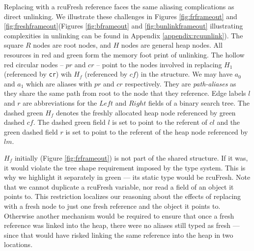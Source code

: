 Replacing with a \textsf{rcuFresh} reference faces the same aliasing complications as direct unlinking.
We illustrate these challenges in Figures \ref{fig:frframeout} and \ref{fig:freshframeout}(Figures \ref{fig:bframeout} and \ref{fig:bunlinkframeout} illustrating complexities in unlinking can be found in Appendix \ref{appendix:rcuunlink}).
The square $R$ nodes are root nodes, and $H$ nodes are general heap nodes.
All resources in red and green form the memory foot print of unlinking. The hollow red circular nodes -- $pr$ and $cr$ -- point to the nodes involved in replacing $H_1$ (referenced by \texttt{cr}) wih $H_f$ (referenced by $cf$) in the structure.
We may have $a_0$ and $a_1$ which are aliases with $pr$ and $cr$ respectively. They are \textit{path-aliases} as they share the same path from root to the node that they reference. 
Edge labels $l$ and $r$ are abbreviations for the $Left$ and $Right$ fields of a binary search tree.
The dashed green $H_f$ denotes the freshly allocated heap node referenced by green dashed  $cf$. The dashed green field $l$ is set to point to the referent of $cl$ and the green dashed field $r$ is set to point to the referent of the heap node referenced by $lm$.

$H_f$ initially (Figure \ref{fig:frframeout}) is not part of the shared structure.  If it was, it would violate the tree shape requirement imposed by the type system.  This is why we highlight it separately in green --- its static type would be \textsf{rcuFresh}.
Note that we cannot duplicate a \textsf{rcuFresh} variable, nor read a field of an object it points to.
This restriction localizes our reasoning about the effects of replacing with a fresh node to just one fresh reference and the object it points to.
Otherwise another mechanism would be required to ensure that once a fresh reference was linked into the heap, there were no aliases still typed as fresh --- since that would have risked linking the same reference into the heap in two locations.

